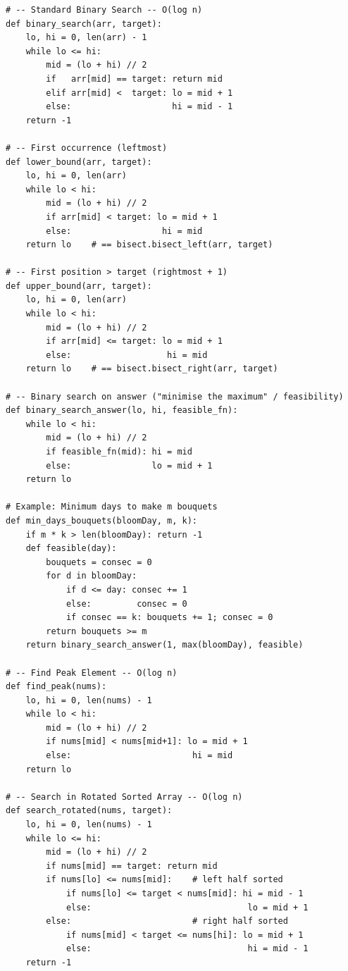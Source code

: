 \documentclass[11pt,a4paper]{report}
\begin{document}
\begin{lstlisting}
# -- Standard Binary Search -- O(log n)
def binary_search(arr, target):
    lo, hi = 0, len(arr) - 1
    while lo <= hi:
        mid = (lo + hi) // 2
        if   arr[mid] == target: return mid
        elif arr[mid] <  target: lo = mid + 1
        else:                    hi = mid - 1
    return -1

# -- First occurrence (leftmost)
def lower_bound(arr, target):
    lo, hi = 0, len(arr)
    while lo < hi:
        mid = (lo + hi) // 2
        if arr[mid] < target: lo = mid + 1
        else:                  hi = mid
    return lo    # == bisect.bisect_left(arr, target)

# -- First position > target (rightmost + 1)
def upper_bound(arr, target):
    lo, hi = 0, len(arr)
    while lo < hi:
        mid = (lo + hi) // 2
        if arr[mid] <= target: lo = mid + 1
        else:                   hi = mid
    return lo    # == bisect.bisect_right(arr, target)

# -- Binary search on answer ("minimise the maximum" / feasibility)
def binary_search_answer(lo, hi, feasible_fn):
    while lo < hi:
        mid = (lo + hi) // 2
        if feasible_fn(mid): hi = mid
        else:                lo = mid + 1
    return lo

# Example: Minimum days to make m bouquets
def min_days_bouquets(bloomDay, m, k):
    if m * k > len(bloomDay): return -1
    def feasible(day):
        bouquets = consec = 0
        for d in bloomDay:
            if d <= day: consec += 1
            else:         consec = 0
            if consec == k: bouquets += 1; consec = 0
        return bouquets >= m
    return binary_search_answer(1, max(bloomDay), feasible)

# -- Find Peak Element -- O(log n)
def find_peak(nums):
    lo, hi = 0, len(nums) - 1
    while lo < hi:
        mid = (lo + hi) // 2
        if nums[mid] < nums[mid+1]: lo = mid + 1
        else:                        hi = mid
    return lo

# -- Search in Rotated Sorted Array -- O(log n)
def search_rotated(nums, target):
    lo, hi = 0, len(nums) - 1
    while lo <= hi:
        mid = (lo + hi) // 2
        if nums[mid] == target: return mid
        if nums[lo] <= nums[mid]:    # left half sorted
            if nums[lo] <= target < nums[mid]: hi = mid - 1
            else:                               lo = mid + 1
        else:                        # right half sorted
            if nums[mid] < target <= nums[hi]: lo = mid + 1
            else:                               hi = mid - 1
    return -1


\end{lstlisting}
\end{document}
